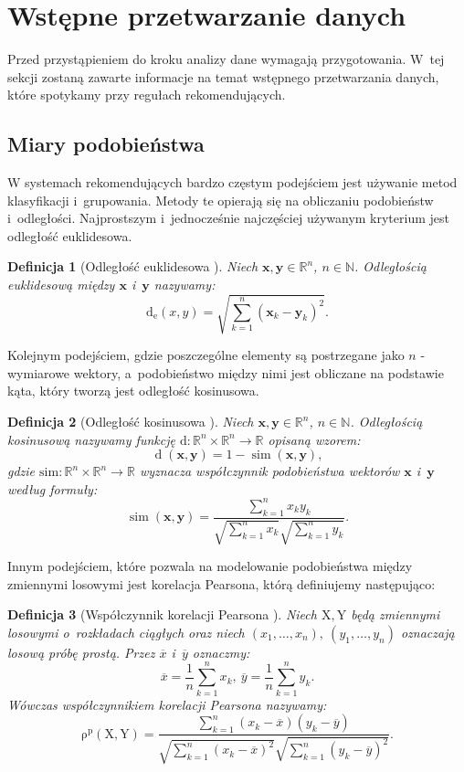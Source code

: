 \documentclass[12pt,a4paper]{report}
\newtheorem{df}{Definicja}[chapter]
\newcommand{\setR}{\mathbb{R}}
\newcommand{\setN}{\mathbb{N}}
\newcommand{\rop}[2]{\operatorname{\rho^p}\left( {#1},{#2} \right)}
\newcommand{\similarity}[2]{\operatorname{sim}\left({#1}, {#2} \right)}
\newcommand{\distance}[2]{\operatorname{d}\left({#1}, {#2} \right)}
\newcommand{\distanceee}[2]{\operatorname{d_e}\left({#1}, {#2} \right)}
\begin{document}
\section{Wstępne przetwarzanie danych}
Przed przystąpieniem do kroku analizy dane wymagają przygotowania. W~tej sekcji zostaną zawarte informacje na temat wstępnego przetwarzania danych, które spotykamy przy regułach rekomendujących.

\subsection{Miary podobieństwa}
W systemach rekomendujących bardzo częstym podejściem jest używanie metod klasyfikacji i~grupowania. Metody te opierają się na obliczaniu podobieństw i~odległości.
Najprostszym i~jednocześnie najczęściej używanym kryterium jest odległość euklidesowa.

\begin{df}[Odległość euklidesowa \citep{rsh}]%

Niech $\mathbf{x},\mathbf{y} \in \setR^n $, $n \in\setN$. Odległością euklidesową między $\mathbf{x}$ i~$\mathbf{y}$ nazywamy:
$$
\distanceee{x}{y} = \sqrt{\sum_{k=1}^n(\mathbf{x}_k-\mathbf{y}_k)^2}.
$$
\end{df}

Kolejnym podejściem, gdzie poszczególne elementy są postrzegane jako $n$ - wymiarowe wektory, a~podobieństwo między nimi jest obliczane na podstawie kąta, który tworzą jest odległość kosinusowa.

\begin{df}[Odległość kosinusowa \citep{rsh}] %
Niech $\mathbf{x},\mathbf{y} \in \setR^n $, $n \in\setN$. Odległością kosinusową nazywamy funkcję $ \mathrm{d}: \setR^n \times \setR^n \to \setR$ opisaną wzorem:
$$
\distance{\mathbf{x}}{\mathbf{y}} = 1 - \similarity{\mathbf{x}}{\mathbf{y}},
$$ 
gdzie $\mathrm{sim}: \setR^n \times \setR^n \to \setR$ wyznacza współczynnik podobieństwa wektorów $\mathbf{x}$ i~$\mathbf{y}$ według formuły:
$$
\similarity{\mathbf{x}}{\mathbf{y}} = \frac{\sum_{k=1}^n x_k y_k}{\sqrt{\sum_{k=1}^n x_k}\sqrt{\sum_{k=1}^n y_k}}.
$$
\end{df}
Innym podejściem, które pozwala na modelowanie podobieństwa między zmiennymi losowymi jest korelacja Pearsona, którą definiujemy następująco:

\begin{df}[Współczynnik korelacji Pearsona \citep{rsh}]

Niech $\mathrm{X},\mathrm{Y}$ będą zmiennymi losowymi o~rozkładach ciągłych oraz niech $(x_1, \ldots, x_n), \: (y_1, \ldots, y_n)$ oznaczają losową próbę prostą. 
Przez $\overline{x}$ i~$\overline{y}$ oznaczmy:
$$
\overline{x}=\frac{1}{n} \sum_{k=1}^n x_k, \: \overline{y}=\frac{1}{n} \sum_{k=1}^n y_k.
$$
Wówczas współczynnikiem korelacji Pearsona nazywamy:
$$
\rop{\mathrm{X}}{\mathrm{Y}} = \frac{\sum_{k=1}^n(x_k - \overline{x})(y_k - \overline{y})}{\sqrt{\sum_{k=1}^n(x_k - \overline{x})^2} \sqrt{\sum_{k=1}^n(y_k - \overline{y})^2 }}.
$$
\end{df}
\end{document}
